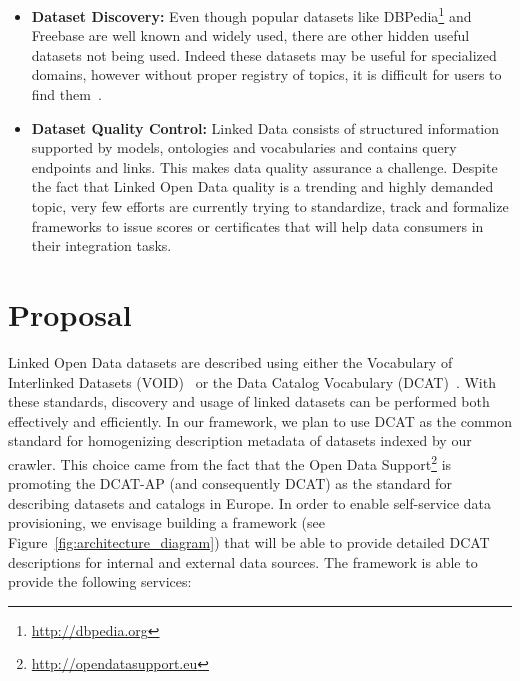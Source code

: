 \documentclass[onecolumn, crcready]{../../Util/LaTEX/iosart2c}
\begin{document}
\begin{itemize}
\begin{itemize}
\end{itemize}
\item {\bf Dataset Discovery:} Even though popular datasets like DBPedia\footnote{\url{http://dbpedia.org}} and Freebase are well known and widely used, there are other hidden useful datasets not being used. Indeed these datasets may be useful for specialized domains, however without proper registry of topics, it is difficult for users to find them~\cite{Lalithsena:WI:13}.
\item {\bf Dataset Quality Control:} Linked Data consists of structured information supported by models, ontologies and vocabularies and contains query endpoints and links. This makes data quality assurance a challenge. Despite the fact that Linked Open Data quality is a trending and highly demanded topic, very few efforts are currently trying to standardize, track and formalize frameworks to issue scores or certificates that will help data consumers in their integration tasks.
\end{itemize}


\section{Proposal}
\label{sec:proposal}

Linked Open Data datasets are described using either the Vocabulary of Interlinked Datasets (VOID)~\cite{Cyganiak:W3C:11} or the Data Catalog Vocabulary (DCAT)~\cite{Erickson:DCV:14}. With these standards, discovery and usage of linked datasets can be performed both effectively and efficiently. In our framework, we plan to use DCAT as the common standard for homogenizing description metadata of datasets indexed by our crawler. This choice came from the fact that the Open Data Support\footnote{\url{http://opendatasupport.eu}} is promoting the DCAT-AP (and consequently DCAT) as the standard for describing datasets and catalogs in Europe.
In order to enable self-service data provisioning, we envisage building a framework (see Figure~\ref{fig:architecture_diagram}) that will be able to provide detailed DCAT descriptions for internal and external data sources. The framework is able to provide the following services:
\end{document}
